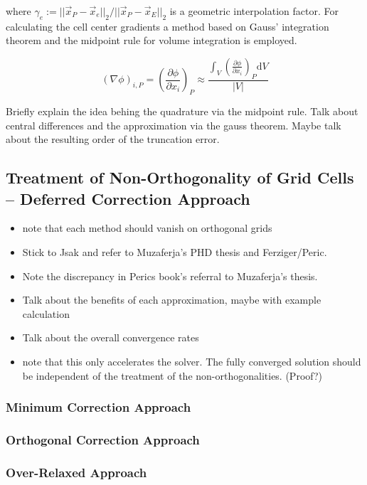     where \( \gamma_e := {||\vec{x}_P - \vec{x}_e||_2}/{||\vec{x}_P - \vec{x}_E||_2}\) is a geometric interpolation factor. For calculating the cell center gradients a method based on Gauss' integration theorem and the midpoint rule for volume integration is employed.

    \begin{displaymath}
      \left( \nabla \phi \right)_{i,P}
      =
      \left( \frac{\partial \phi}{\partial x_i}\right)_P
      \approx
      \frac{\int_V\left(\frac{\partial \phi}{\partial x_i}\right)_P\mathrm{d}V}{|V|}
    \end{displaymath}

    Briefly explain the idea behing the quadrature via the midpoint rule. Talk about central differences and the approximation via the gauss theorem. Maybe talk about the resulting order of the truncation error. 

    \subsection{Treatment of Non-Orthogonality of Grid Cells -- Deferred Correction Approach}

    \begin{itemize}
      \item note that each method should vanish on orthogonal grids
      \item Stick to Jsak and refer to Muzaferja's PHD thesis and Ferziger/Peric. 
      \item Note the discrepancy in Perics book's referral to Muzaferja's thesis. 
      \item Talk about the benefits of each approximation, maybe with example calculation 
      \item Talk about the overall convergence rates
      \item note that this only accelerates the solver. The fully converged solution should be independent of the treatment of the non-orthogonalities. (Proof?)
    \end{itemize}

      \subsubsection{Minimum Correction Approach}
      \subsubsection{Orthogonal Correction Approach}
      \subsubsection{Over-Relaxed Approach}


